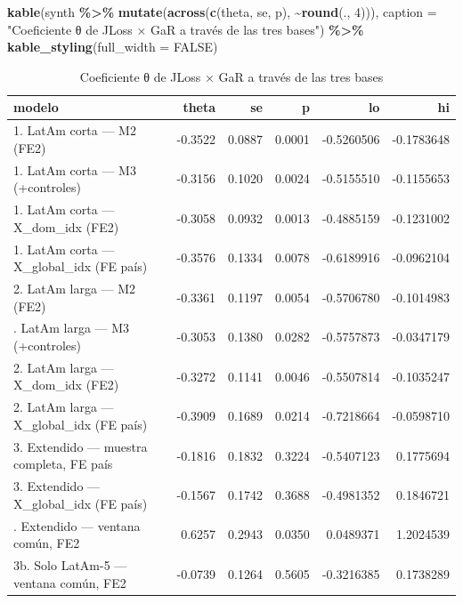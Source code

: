 \documentclass[
]{article}
\newenvironment{Shaded}{\begin{snugshade}}{\end{snugshade}}
\newcommand{\AttributeTok}[1]{\textcolor[rgb]{0.13,0.29,0.53}{#1}}
\newcommand{\ConstantTok}[1]{\textcolor[rgb]{0.56,0.35,0.01}{#1}}
\newcommand{\DecValTok}[1]{\textcolor[rgb]{0.00,0.00,0.81}{#1}}
\newcommand{\FunctionTok}[1]{\textcolor[rgb]{0.13,0.29,0.53}{\textbf{#1}}}
\newcommand{\NormalTok}[1]{#1}
\newcommand{\SpecialCharTok}[1]{\textcolor[rgb]{0.81,0.36,0.00}{\textbf{#1}}}
\newcommand{\StringTok}[1]{\textcolor[rgb]{0.31,0.60,0.02}{#1}}
\begin{document}
\begin{Shaded}
\begin{Highlighting}[]
\FunctionTok{kable}\NormalTok{(synth }\SpecialCharTok{\%\textgreater{}\%} \FunctionTok{mutate}\NormalTok{(}\FunctionTok{across}\NormalTok{(}\FunctionTok{c}\NormalTok{(theta, se, p), }\SpecialCharTok{\textasciitilde{}}\FunctionTok{round}\NormalTok{(., }\DecValTok{4}\NormalTok{))),}
      \AttributeTok{caption =} \StringTok{"Coeficiente θ de JLoss × GaR a través de las tres bases"}\NormalTok{) }\SpecialCharTok{\%\textgreater{}\%}
  \FunctionTok{kable\_styling}\NormalTok{(}\AttributeTok{full\_width =} \ConstantTok{FALSE}\NormalTok{)}
\end{Highlighting}
\end{Shaded}

\begin{longtable}[t]{lrrrrr}
\caption{\label{tab:synthesis}Coeficiente θ de JLoss × GaR a través de las tres bases}\\
\toprule
modelo & theta & se & p & lo & hi\\
\midrule
1. LatAm corta — M2 (FE2) & -0.3522 & 0.0887 & 0.0001 & -0.5260506 & -0.1783648\\
1. LatAm corta — M3 (+controles) & -0.3156 & 0.1020 & 0.0024 & -0.5155510 & -0.1155653\\
1. LatAm corta — X\_dom\_idx (FE2) & -0.3058 & 0.0932 & 0.0013 & -0.4885159 & -0.1231002\\
1. LatAm corta — X\_global\_idx (FE país) & -0.3576 & 0.1334 & 0.0078 & -0.6189916 & -0.0962104\\
2. LatAm larga — M2 (FE2) & -0.3361 & 0.1197 & 0.0054 & -0.5706780 & -0.1014983\\
\addlinespace
2. LatAm larga — M3 (+controles) & -0.3053 & 0.1380 & 0.0282 & -0.5757873 & -0.0347179\\
2. LatAm larga — X\_dom\_idx (FE2) & -0.3272 & 0.1141 & 0.0046 & -0.5507814 & -0.1035247\\
2. LatAm larga — X\_global\_idx (FE país) & -0.3909 & 0.1689 & 0.0214 & -0.7218664 & -0.0598710\\
3. Extendido — muestra completa, FE país & -0.1816 & 0.1832 & 0.3224 & -0.5407123 & 0.1775694\\
3. Extendido — X\_global\_idx (FE país) & -0.1567 & 0.1742 & 0.3688 & -0.4981352 & 0.1846721\\
\addlinespace
3. Extendido — ventana común, FE2 & 0.6257 & 0.2943 & 0.0350 & 0.0489371 & 1.2024539\\
3b. Solo LatAm-5 — ventana común, FE2 & -0.0739 & 0.1264 & 0.5605 & -0.3216385 & 0.1738289\\
\bottomrule
\end{longtable}
\end{document}
